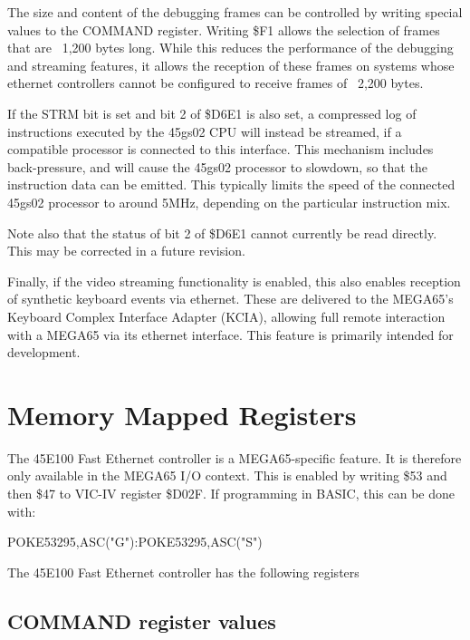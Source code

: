 The size and content of the debugging frames can be controlled by writing special values to the
COMMAND register.  Writing \$F1 allows the selection of frames that are ~1,200 bytes long.
While this reduces the performance of the debugging and streaming features, it allows the reception
of these frames on systems whose ethernet controllers cannot be configured to receive frames
of ~2,200 bytes.

If the STRM bit is set and bit 2 of \$D6E1 is also set, a compressed log of instructions executed by
the 45gs02 CPU will instead be streamed, if a compatible processor is connected to this interface.
This mechanism includes back-pressure, and will cause the 45gs02 processor to slowdown,
so that the instruction data can be emitted.  This typically limits the speed of the connected
45gs02 processor to around 5MHz, depending on the particular instruction mix.

Note also that
the status of bit 2 of \$D6E1 cannot currently be read directly. This may be corrected in a future
revision.

Finally, if the video streaming functionality is enabled, this also enables reception of synthetic
keyboard events via ethernet.  These are delivered to the MEGA65's Keyboard Complex Interface Adapter
(KCIA), allowing full remote interaction with a MEGA65 via its ethernet interface.  This feature is
primarily intended for development.

\section{Memory Mapped Registers}

The 45E100 Fast Ethernet controller is a MEGA65-specific feature.
It is therefore only available in the MEGA65 I/O context.
This is enabled by writing \$53 and then \$47 to VIC-IV register \$D02F.
If programming in BASIC, this can be done with:

\begin{screencode}
POKE53295,ASC("G"):POKE53295,ASC("S")
\end{screencode}

The 45E100 Fast Ethernet controller has the following registers



\subsection{COMMAND register values}


